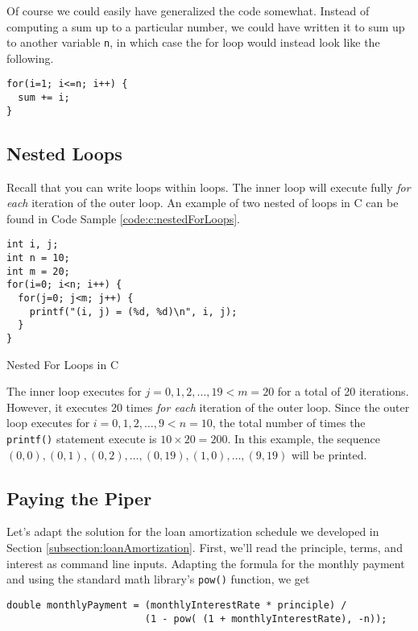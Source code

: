Of course we could easily have generalized the code somewhat.  Instead of computing
a sum up to a particular number, we could have written it to sum up to another
variable \texttt{n}, in which case the for loop would instead look like the
following.

\begin{verbatim}
for(i=1; i<=n; i++) {
  sum += i;
}
\end{verbatim}

\subsection{Nested Loops}

Recall that you can write loops within loops.  The inner loop will execute fully 
\emph{for each} iteration of the outer loop.  An example of two nested of
loops in C can be found in Code Sample \ref{code:c:nestedForLoops}.

\begin{listing}[!h]
\begin{verbatim}
int i, j;
int n = 10;
int m = 20;
for(i=0; i<n; i++) {
  for(j=0; j<m; j++) {
    printf("(i, j) = (%d, %d)\n", i, j);
  }
}
\end{verbatim}
  \caption{Nested For Loops in C}
  \label{code:c:nestedForLoops}
\end{listing}

The inner loop executes for $j = 0, 1, 2, \ldots, 19 < m = 20$ for a total
of 20 iterations.  However, it executes 20 times \emph{for each} iteration of
the outer loop.  Since the outer loop executes for $i = 0, 1, 2, \ldots, 9 < n = 10$, 
the total number of times the \texttt{printf()} statement execute is
$10 \times 20 = 200$.  In this example, the sequence $(0, 0), (0, 1), (0, 2), \ldots, (0,19), (1, 0), \ldots, (9, 19)$
will be printed.

\subsection{Paying the Piper}

Let's adapt the solution for the loan amortization schedule we developed in 
Section \ref{subsection:loanAmortization}.  First, we'll read the principle, 
terms, and interest as command line inputs.  Adapting the formula for the 
monthly payment and using the standard
math library's \texttt{pow()} function, we get

\begin{verbatim}
double monthlyPayment = (monthlyInterestRate * principle) / 
                        (1 - pow( (1 + monthlyInterestRate), -n));
\end{verbatim}

